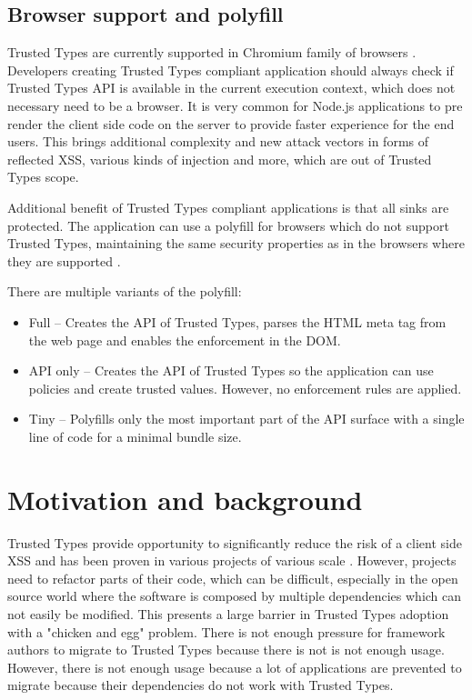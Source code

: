 \subsection{Browser support and polyfill}

Trusted Types are currently supported in Chromium family of browsers \cite{mdn:tt_compatibility}.
Developers creating Trusted Types compliant application should always check if Trusted Types API is
available in the current execution context, which does not necessary need to be a browser. It is
very common for Node.js applications to pre render the client side code on the server to provide
faster experience for the end users. This brings additional complexity and new attack vectors in
forms of reflected XSS, various kinds of injection and more, which are out of Trusted Types scope.

Additional benefit of Trusted Types compliant applications is that all sinks are protected. The
application can use a polyfill for browsers which do not support Trusted Types, maintaining the same
security properties as in the browsers where they are supported \cite{xss_nowhere_with_polyfill}.

There are multiple variants of the polyfill:

\begin{itemize}
  \item Full -- Creates the API of Trusted Types, parses the HTML meta tag from the web page
        and enables the enforcement in the DOM.
  \item API only -- Creates the API of Trusted Types so the application can use policies and create
        trusted values. However, no enforcement rules are applied.
  \item Tiny -- Polyfills only the most important part of the API surface with a single line of code
        for a minimal bundle size.
\end{itemize}

\section{Motivation and background}

Trusted Types provide opportunity to significantly reduce the risk of a client side XSS and has been
proven in various projects of various scale \cite{tt_web_framework_paper}
\cite{tt_integration_list}. However, projects need to refactor parts of their code, which can be
difficult, especially in the open source world where the software is composed by multiple
dependencies which can not easily be modified. This presents a large barrier in Trusted Types
adoption \cite{tt_web_framework_paper} with a "chicken and egg" problem. There is not enough
pressure for framework authors to migrate to Trusted Types because there is not is not enough usage.
However, there is not enough usage because a lot of applications are prevented to migrate because
their dependencies do not work with Trusted Types.

